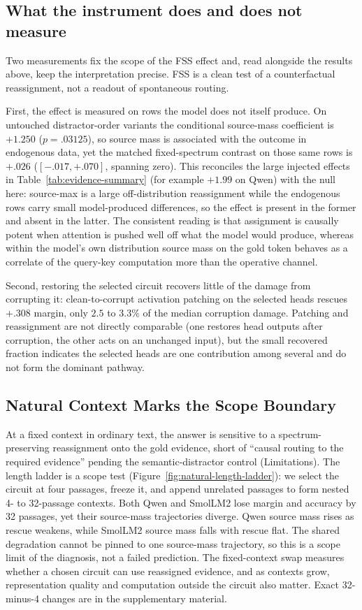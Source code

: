 \documentclass{article}
\begin{document}
\subsection{What the instrument does and does not measure}
\label{sec:bounds}

Two measurements fix the scope of the FSS effect and, read alongside the results above, keep the
interpretation precise. FSS is a clean test of a counterfactual reassignment, not a readout of spontaneous
routing.

First, the effect is measured on rows the model does not itself produce. On untouched distractor-order variants
the conditional source-mass coefficient is $+1.250$ ($p=.03125$), so source mass is associated with the
outcome in endogenous data, yet the matched fixed-spectrum contrast on those same rows is $+.026$
($[-.017,+.070]$, spanning zero). This reconciles the large injected effects in
Table~\ref{tab:evidence-summary} (for example $+1.99$ on Qwen) with the null here: source-max is a large
off-distribution reassignment while the endogenous rows carry small model-produced differences, so the effect
is present in the former and absent in the latter. The consistent reading is that assignment is causally potent
when attention is pushed well off what the model would produce, whereas within the model's own distribution
source mass on the gold token behaves as a correlate of the query-key computation more than the operative
channel.

Second, restoring the selected circuit recovers little of the damage from corrupting it: clean-to-corrupt
activation patching on the selected heads rescues $+.308$ margin, only $2.5$ to $3.3\%$ of the median corruption
damage. Patching and reassignment are not directly comparable (one restores head outputs after corruption, the
other acts on an unchanged input), but the small recovered fraction indicates the selected heads are one
contribution among several and do not form the dominant pathway.

\subsection{Natural Context Marks the Scope Boundary}

At a fixed context in ordinary text, the answer is sensitive to a spectrum-preserving reassignment onto the
gold evidence, short of ``causal routing to the required evidence'' pending the semantic-distractor control
(Limitations). The length ladder is a scope test (Figure~\ref{fig:natural-length-ladder}): we select the
circuit at four passages, freeze it, and append unrelated passages to form nested 4- to 32-passage contexts.
Both Qwen and SmolLM2 lose margin and
accuracy by 32 passages, yet their source-mass trajectories diverge. Qwen source mass rises as rescue weakens,
while SmolLM2 source mass falls with rescue flat. The shared degradation cannot be pinned to one source-mass
trajectory, so this is a scope limit of the diagnosis, not a failed prediction. The fixed-context swap measures
whether a chosen circuit can use reassigned evidence, and as contexts grow, representation quality and
computation outside the circuit also matter. Exact 32-minus-4 changes are in the supplementary material.
\end{document}
